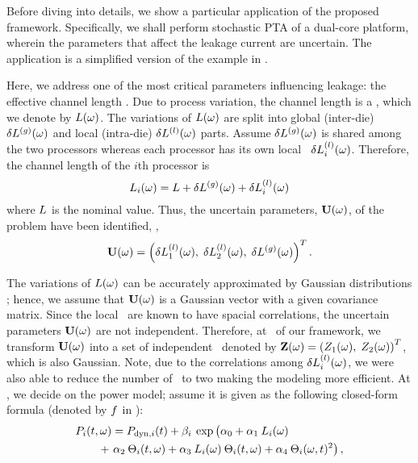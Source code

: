 Before diving into details, we show a particular application of the proposed framework. Specifically, we shall perform stochastic PTA of a dual-core platform, wherein the parameters that affect the leakage current are uncertain. The application is a simplified version of the example in .

Here, we address one of the most critical parameters influencing leakage: the effective channel length \cite{chandra2010, juan2011, juan2012, srivastava2010, shen2009}. Due to process variation, the channel length is a \rv, which we denote by $L(\omega)$. The variations of $L(\omega)$ are split into global (inter-die) ${\delta L^{(g)}}(\omega)$ and local (intra-die) $\delta L^{(l)}(\omega)$ parts. Assume ${\delta L^{(g)}}(\omega)$ is shared among the two processors whereas each processor has its own local \rv\ $\delta L^{(l)}_i(\omega)$. Therefore, the channel length of the $i$th processor is
\begin{equation} \elabel{leakage-partition}
  \Leff_i(\o) = \nLeff + \gLeff(\o) + \lLeff_i(\o)
\end{equation}
where $L$ is the nominal value. Thus, the uncertain parameters, $\mathbf{U}(\omega)$, of the problem have been identified, \ie,
\[
  \mathbf{U}(\omega) = \left(\delta L^{(l)}_1(\omega), \; \delta L^{(l)}_2(\omega), \; {\delta L^{(g)}}(\omega) \right)^T.
\]


The variations of $L(\omega)$ can be accurately approximated by Gaussian distributions \cite{juan2011, juan2012, srivastava2010}; hence, we assume that $\mathbf{U}(\omega)$ is a Gaussian vector with a given covariance matrix. Since the local \rvs\ are known to have spacial correlations, the uncertain parameters $\mathbf{U}(\omega)$ are not independent. Therefore, at \ of our framework, we transform $\mathbf{U}(\omega)$ into a set of independent \rvs\ denoted by $\mathbf{Z}(\omega) = \left(Z_1(\omega), \; Z_2(\omega)\right)^T$, which is also Gaussian. Note, due to the correlations among $\delta L^{(l)}_i(\omega)$, we were also able to reduce the number of \rvs\ to two making the modeling more efficient. At , we decide on the power model; assume it is given as the following closed-form formula (denoted by $f$ in ):
\begin{align*}
  & \P_i(\t, \o) = \P_{\dyn, i}(\t) + \beta_i \: \exp \left(\vphantom{\T^2_i} \alpha_0 + \alpha_1 \: \Leff_i(\o) \right. \\
  & \qquad {} + \left. \alpha_2 \: \T_i(\t, \o) + \alpha_3 \: \Leff_i(\o) \: \T_i(\t, \o) + \alpha_4 \: \T_i(\o, \t)^2 \right),
\end{align*}
